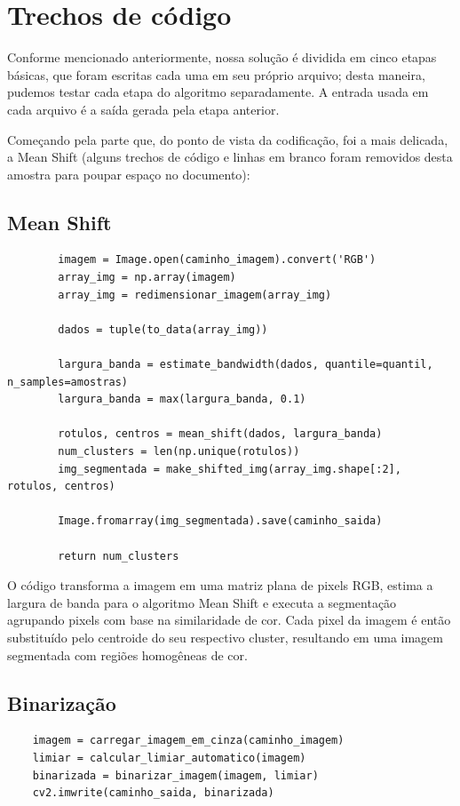 \documentclass{article}
\begin{document}
\section{Trechos de código}

Conforme mencionado anteriormente, nossa solução é dividida em cinco etapas básicas, que foram escritas cada uma em seu próprio arquivo; desta maneira, pudemos testar cada etapa do algoritmo separadamente. A entrada usada em cada arquivo é a saída gerada pela etapa anterior.

Começando pela parte que, do ponto de vista da codificação, foi a mais delicada, a Mean Shift (alguns trechos de código e linhas em branco foram removidos desta amostra para poupar espaço no documento):

\subsection{Mean Shift}

{\small}
\begin{verbatim}
        imagem = Image.open(caminho_imagem).convert('RGB')
        array_img = np.array(imagem)
        array_img = redimensionar_imagem(array_img)

        dados = tuple(to_data(array_img))

        largura_banda = estimate_bandwidth(dados, quantile=quantil, n_samples=amostras)
        largura_banda = max(largura_banda, 0.1)

        rotulos, centros = mean_shift(dados, largura_banda)
        num_clusters = len(np.unique(rotulos))
        img_segmentada = make_shifted_img(array_img.shape[:2], rotulos, centros)

        Image.fromarray(img_segmentada).save(caminho_saida)

        return num_clusters
\end{verbatim}

O código transforma a imagem em uma matriz plana de pixels RGB, estima a largura de banda para o algoritmo Mean Shift e executa a segmentação agrupando pixels com base na similaridade de cor. Cada pixel da imagem é então substituído pelo centroide do seu respectivo cluster, resultando em uma imagem segmentada com regiões homogêneas de cor.

\subsection{Binarização}

\begin{verbatim}
    imagem = carregar_imagem_em_cinza(caminho_imagem)
    limiar = calcular_limiar_automatico(imagem)
    binarizada = binarizar_imagem(imagem, limiar)
    cv2.imwrite(caminho_saida, binarizada)
\end{verbatim}
\end{document}
